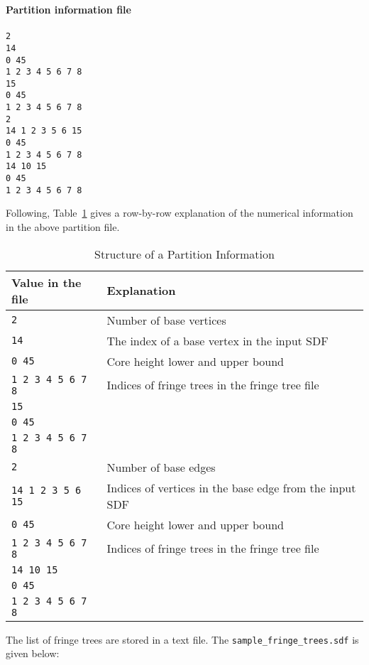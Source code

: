 \documentclass[11pt,titlepage,dvipdfmx,twoside]{article}
\begin{document}
\begin{oframed}
{\bf Partition information file}\\\\
{\tt 2				\\
14              \\
0 45            \\
1 2 3 4 5 6 7 8 \\
15              \\
0 45            \\
1 2 3 4 5 6 7 8 \\
2               \\
14 1 2 3 5 6 15 \\
0 45            \\
1 2 3 4 5 6 7 8 \\
14 10 15        \\
0 45            \\
1 2 3 4 5 6 7 8 \\
}
\end{oframed}

Following, Table~\ref{tab:PartitionFormat}
gives a row-by-row explanation of the numerical information in the
above partition file.
\bigskip
\begin{table}[H]
\begin{center} \caption{Structure of a Partition Information}
\label{tab:PartitionFormat}
  \begin{tabular}{l|l}
  Value in the file & Explanation \\ \hline \hline
{\tt  2} & Number of base vertices \\ \hline
{\tt 14}          & The index of a base vertex in the input SDF     \\
{\tt0 45 }       & Core height lower and upper bound    \\
{\tt 1 2 3 4 5 6 7 8} & Indices of fringe trees in the fringe tree file\\
{\tt15}              &\\
{\tt 0 45}            &\\
{\tt1 2 3 4 5 6 7 8} \\ \hline
{\tt2}         & Number of base edges      \\ \hline
{\tt 14 1 2 3 5 6 15}  & Indices of vertices in the base edge from the input SDF \\
{\tt 0 45}       &Core height lower and upper bound      \\
{\tt 1 2 3 4 5 6 7 8}  &  Indices of fringe trees in the fringe tree file\\
{\tt 14 10 15}    &    \\
{\tt 0 45}            &\\
{\tt 1 2 3 4 5 6 7 8} & \\ \hline

  \end{tabular}
\end{center}
\end{table}
The list of fringe trees are stored in a text file. 
The {\tt sample\_fringe\_trees.sdf} is given below: 
\end{document}
